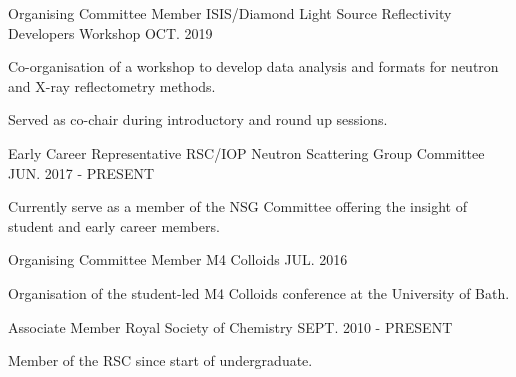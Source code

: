 \begin{cventries}
  \cventry
    {Organising Committee Member}
    {ISIS/Diamond Light Source Reflectivity Developers Workshop}
    {}
    {OCT. 2019}
    {
      \begin{cvitems}
        \item{Co-organisation of a workshop to develop data analysis and formats for neutron and X-ray reflectometry methods.}
        \item{Served as co-chair during introductory and round up sessions.}
      \end{cvitems}
    }
  \cventry
  	{Early Career Representative}
    {RSC/IOP Neutron Scattering Group Committee}
    {}
    {JUN. 2017 - PRESENT}
    {
      \begin{cvitems}
      	\item{Currently serve as a member of the NSG Committee offering the insight of student and early career members.}
	  \end{cvitems}
	}
  \cventry
    {Organising Committee Member}
    {M4 Colloids}
    {}
    {JUL. 2016}
    {
      \begin{cvitems}
        \item{Organisation of the student-led M4 Colloids conference at the University of Bath.}
      \end{cvitems}
    }
  \cventry
    {Associate Member}
    {Royal Society of Chemistry}
    {}
    {SEPT. 2010 - PRESENT}
    {
      \begin{cvitems}
      	\item{Member of the RSC since start of undergraduate.}
      \end{cvitems}
    }
\end{cventries}
